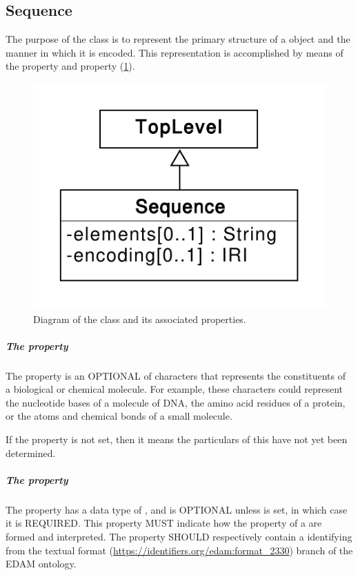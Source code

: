 \subsection{Sequence}
\label{sec:Sequence}
The purpose of the  class is to represent the primary structure of a  object and the manner in which it is encoded. This representation is accomplished  by means of the  property and  property (\ref{uml:sequence}).

\begin{figure}[ht]
\begin{center}
\includegraphics[scale=0.6]{uml/sequence}
\caption[]{Diagram of the  class and its associated properties.}
\label{uml:sequence}
\end{center}
\end{figure}


\subparagraph{The  property}
\label{sec:elements}
The  property is an OPTIONAL  of characters that represents the constituents of a biological or chemical molecule. 
For example, these characters could represent the nucleotide bases of a molecule of DNA, the amino acid residues of a protein, or the atoms and chemical bonds of a small molecule.

If the  property is not set, then it means the particulars of this  have not yet been determined.


\subparagraph{The  property}
\label{sec:encoding}

The  property has a data type of , and is OPTIONAL unless  is set, in which case it is REQUIRED.
This property MUST indicate how the  property of a  are formed and interpreted.
The  property SHOULD respectively contain a  identifying from the textual format (\url{https://identifiers.org/edam:format_2330}) branch of the EDAM ontology.

